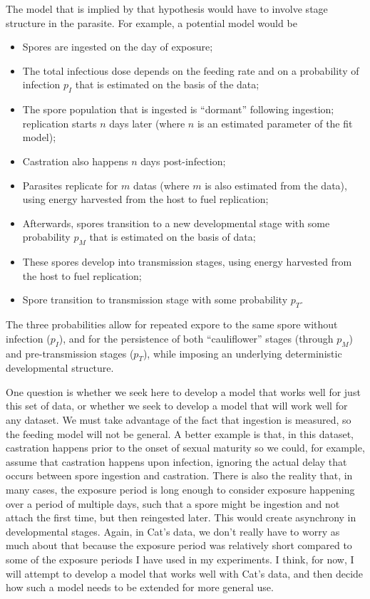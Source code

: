 \documentclass[11pt,reqno,final,pdftex]{amsart}\usepackage[]{graphicx}\usepackage[]{color}
\theoremstyle{plain}
\numberwithin{equation}{part}
\begin{document}
The model that is implied by that hypothesis would have to involve stage structure in the parasite.
For example, a potential model would be
\begin{itemize}
\item Spores are ingested on the day of exposure;
\item The total infectious dose depends on the feeding rate and on a probability of infection $p_I$ that is estimated on the basis of the data;
\item The spore population that is ingested is ``dormant'' following ingestion; replication starts $n$ days later (where $n$ is an estimated parameter of the fit model);
\item Castration also happens $n$ days post-infection;
\item Parasites replicate for $m$ datas (where $m$ is also estimated from the data), using energy harvested from the host to fuel replication;
\item Afterwards, spores transition to a new developmental stage with some probability $p_M$ that is estimated on the basis of data;
\item These spores develop into transmission stages, using energy harvested from the host to fuel replication;
\item Spore transition to transmission stage with some probability $p_T$.
\end{itemize}

The three probabilities allow for repeated expore to the same spore without infection ($p_I$), and for the persistence of both ``cauliflower'' stages (through $p_M$) and pre-transmission stages ($p_T$), while imposing an underlying deterministic developmental structure.

One question is whether we seek here to develop a model that works well for just this set of data, or whether we seek to develop a model that will work well for any dataset.
We must take advantage of the fact that ingestion is measured, so the feeding model will not be general.
A better example is that, in this dataset, castration happens prior to the onset of sexual maturity so we could, for example, assume that castration happens upon infection, ignoring the actual delay that occurs between spore ingestion and castration.
There is also the reality that, in many cases, the exposure period is long enough to consider exposure happening over a period of multiple days, such that a spore might be ingestion and not attach the first time, but then reingested later.
This would create asynchrony in developmental stages.
Again, in Cat's data, we don't really have to worry as much about that because the exposure period was relatively short compared to some of the exposure periods I have used in my experiments.
I think, for now, I will attempt to develop a model that works well with Cat's data, and then decide how such a model needs to be extended for more general use.
\end{document}
